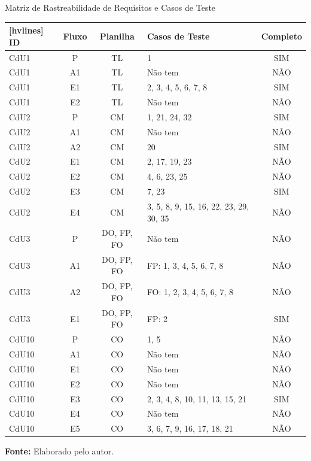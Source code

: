 \begin{quadro}[h!]
    \centering
    \caption{Matriz de Rastreabilidade de Requisitos e Casos de Teste}
    \label{qua:matriz_rastreabilidade}
    \renewcommand{\arraystretch}{1.3}
    \begin{NiceTabular}{lccp{7cm}c}[hvlines]
        \toprule
        \textbf{ID} & \textbf{Fluxo} & \textbf{Planilha} & \textbf{Casos de Teste} & \textbf{Completo} \\
        \midrule
        CdU1 & P & TL & 1 & SIM \\
        CdU1 & A1 & TL & Não tem & NÃO \\
        CdU1 & E1 & TL & 2, 3, 4, 5, 6, 7, 8 & SIM \\
        CdU1 & E2 & TL & Não tem & NÃO \\
        CdU2 & P & CM & 1, 21, 24, 32 & SIM \\
        CdU2 & A1 & CM & Não tem & NÃO \\
        CdU2 & A2 & CM & 20 & SIM \\
        CdU2 & E1 & CM & 2, 17, 19, 23 & NÃO \\
        CdU2 & E2 & CM & 4, 6, 23, 25 & NÃO \\
        CdU2 & E3 & CM & 7, 23 & SIM \\
        CdU2 & E4 & CM & 3, 5, 8, 9, 15, 16, 22, 23, 29, 30, 35 & NÃO \\
        CdU3 & P & DO, FP, FO & Não tem & NÃO \\
        CdU3 & A1 & DO, FP, FO & FP: 1, 3, 4, 5, 6, 7, 8 & NÃO \\
        CdU3 & A2 & DO, FP, FO & FO: 1, 2, 3, 4, 5, 6, 7, 8 & NÃO \\
        CdU3 & E1 & DO, FP, FO & FP: 2 & SIM \\
        CdU10 & P & CO & 1, 5 & NÃO \\
        CdU10 & A1 & CO & Não tem & NÃO \\
        CdU10 & E1 & CO & Não tem & NÃO \\
        CdU10 & E2 & CO & Não tem & NÃO \\
        CdU10 & E3 & CO & 2, 3, 4, 8, 10, 11, 13, 15, 21 & SIM \\
        CdU10 & E4 & CO & Não tem & NÃO \\
        CdU10 & E5 & CO & 3, 6, 7, 9, 16, 17, 18, 21 & NÃO \\
        \bottomrule
    \end{NiceTabular}

    \vspace{5pt}
    \hspace*{0.75cm}\raggedright{\small \textbf{Fonte:} Elaborado pelo autor.}
\end{quadro}

